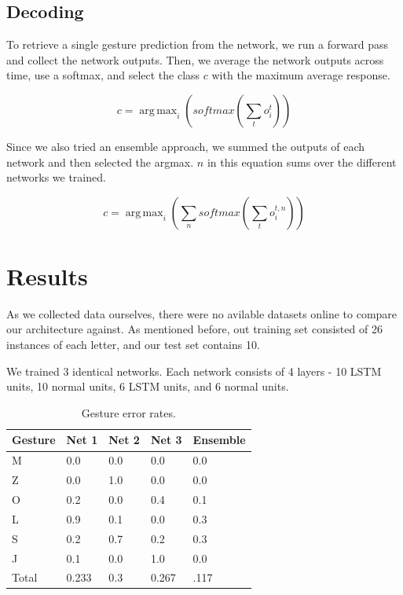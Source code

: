 \documentclass[11pt]{article}
\DeclareMathOperator*{\argmax}{arg\,max}
\begin{document}
\subsection{Decoding}

To retrieve a single gesture prediction from the network,
we run a forward pass and collect the network outputs. 
Then, we average the network outputs across time, use a softmax,
and select the class \(c\) with the maximum average response.

\[ c = \argmax_{i}(softmax(\sum_{t} o_{i}^{t})) \]

Since we also tried an ensemble approach, we summed the outputs
of each network and then selected the argmax. 
\(n\) in this equation sums over the different networks we trained.

\[ c = \argmax_{i}(\sum_{n} softmax(\sum_{t} o_{i}^{t,n})) \]

\section{Results}

As we collected data ourselves, there were no avilable datasets
online to compare our architecture against. As mentioned before, 
out training set consisted of 26 instances of each letter, and
our test set contains 10.

We trained 3 identical networks. Each network consists of 4 layers -
10 LSTM units, 10 normal units, 6 LSTM units, and 6 normal units.

\begin{table}[h]
\begin{center}
\begin{tabular}{|l|l|l|l|l|}
\hline \bf Gesture & Net 1 & Net 2 & Net 3 & Ensemble \bf \\ 
\hline
M & 0.0 & 0.0 & 0.0 & 0.0 \\
Z & 0.0 & 1.0 & 0.0 & 0.0 \\
O & 0.2 & 0.0 & 0.4 & 0.1 \\
L & 0.9 & 0.1 & 0.0 & 0.3 \\
S & 0.2 & 0.7 & 0.2 & 0.3 \\
J & 0.1 & 0.0 & 1.0 & 0.0 \\
\hline
Total & 0.233 & 0.3 & 0.267 &.117\\
\hline
\end{tabular}
\end{center}
\caption{\label{font-table} Gesture error rates.}
\end{table}
\end{document}
